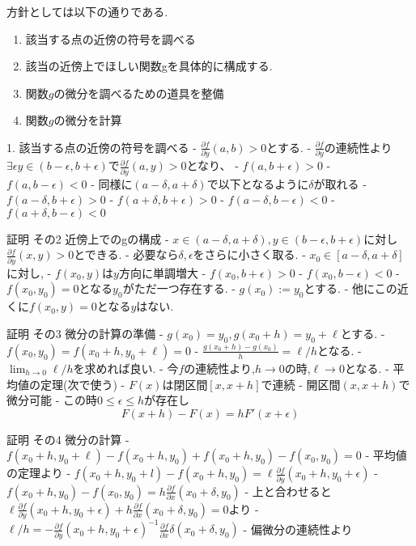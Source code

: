 方針としては以下の通りである.

\begin{enumerate}
    \item 該当する点の近傍の符号を調べる
    \item 該当の近傍上でほしい関数gを具体的に構成する.
    \item 関数$g$の微分を調べるための道具を整備
    \item 関数$g$の微分を計算
\end{enumerate}

1. 該当する点の近傍の符号を調べる
- $\frac{\partial f}{\partial y}(a, b) > 0$とする.
- $\frac{\partial f}{\partial y}$の連続性より$\exists  \epsilon y \in (b - \epsilon, b + \epsilon)$で$\frac{\partial f}{\partial y}(a, y) > 0$となり、
  - $f(a, b + \epsilon) > 0$
  - $f(a, b - \epsilon) < 0$
- 同様に$(a - \delta, a + \delta)$で以下となるように$\delta$が取れる
  - $f(a - \delta, b + \epsilon) > 0$
  - $f(a + \delta, b + \epsilon) > 0$
  - $f(a - \delta, b - \epsilon) < 0$
  - $f(a + \delta, b - \epsilon) < 0$

証明 その2 近傍上でのgの構成
- $x \in (a - \delta, a + \delta), y \in (b - \epsilon, b + \epsilon)$に対し$\frac{\partial f}{\partial y}(x, y) > 0$とできる.
  - 必要なら$\delta, \epsilon$をさらに小さく取る.
- $x_0 \in [a - \delta, a + \delta]$に対し,
  - $f(x_0, y)$は$y$方向に単調増大
  - $f(x_0, b + \epsilon) > 0$
  - $f(x_0, b - \epsilon) < 0$
- $f(x_0, y_0) = 0$となる$y_0$がただ一つ存在する.
- $g(x_0):= y_0$とする.
- 他にこの近くに$f(x_0, y) = 0$となる$y$はない.


証明 その3 微分の計算の準備
- $g(x_0) = y_0, g(x_0 + h) = y_0 + \ell$とする.
  - $f(x_0, y_0) = f(x_0 + h, y_0 + \ell) = 0$
- $\frac{g(x_0 + h) - g(x_0)}{h} = \ell / h$となる.
- $\lim_{h \to 0} \ell / h$を求めれば良い.
- 今$f$の連続性より,$h \to 0$の時,$\ell \to 0$となる.
- 平均値の定理(次で使う)
  - $F(x)$は閉区間$[x, x+h]$で連続
  - 開区間$(x, x + h)$で微分可能
  - この時$0 \le \epsilon \le h$が存在し
  $$F(x+h) - F(x) = hF'(x+ \epsilon)$$

証明 その4 微分の計算
- $f(x_0 + h, y_0 + \ell) - f(x_0 + h, y_0) + f(x_0+ h, y_0) - f(x_0, y_0) = 0$
- 平均値の定理より
  - $f(x_0 + h, y_0 + l) - f(x_0 + h, y_0) = \ell \frac{\partial f}{\partial y}(x_0 + h, y_0 + \epsilon)$
  - $f(x_0+ h, y_0) - f(x_0, y_0) = h \frac{\partial f}{\partial x} (x_0 + \delta ,y_0)$
- 上と合わせると$\ell \frac{\partial f}{\partial y}(x_0 + h, y_0 + \epsilon) + h \frac{\partial f}{\partial x }(x_0 + \delta ,y_0) = 0$より
- $\ell / h = - \frac{\partial f}{\partial y}(x_0 + h, y_0 + \epsilon)^{-1} \frac{\partial f}{\partial x}\delta (x_0 + \delta ,y_0)$
- 偏微分の連続性より

